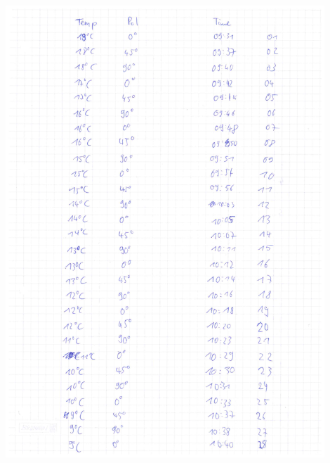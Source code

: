 \documentclass[12pt]{article}
\begin{document}
\begin{minipage}{\textwidth}
	\centering
	\includegraphics[width=0.9\textwidth]{laborbuch/laborbuch5.pdf}
\end{minipage}
\end{document}
